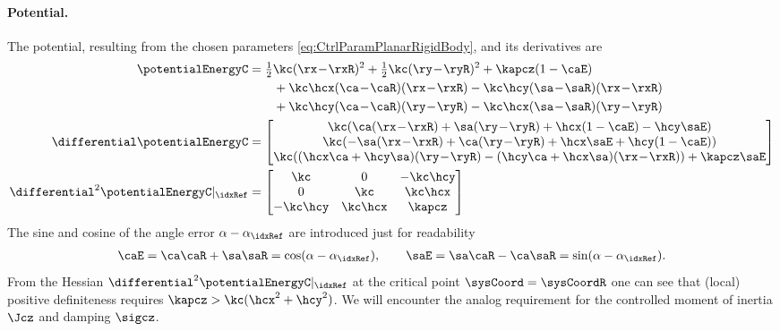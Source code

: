 \paragraph{Potential.}
The potential, resulting from the chosen parameters \eqref{eq:CtrlParamPlanarRigidBody}, and its derivatives are
\begin{subequations}
\begin{align}
 \potentialEnergyC &= \tfrac{1}{2} \kc (\rx\!-\!\rxR)^2 + \tfrac{1}{2} \kc (\ry\!-\!\ryR)^2 + \kapcz (1-\caE)
\nonumber\\
 &\qquad+ \kc\hcx(\ca\!-\!\caR)(\rx\!-\!\rxR) - \kc\hcy(\sa\!-\!\saR)(\rx\!-\!\rxR)
\nonumber\\
 &\qquad+ \kc\hcy(\ca\!-\!\caR)(\ry\!-\!\ryR) - \kc\hcx(\sa\!-\!\saR)(\ry\!-\!\ryR)
\label{eq:CtrlPotentialPlanarRigidBody}\\
 \differential \potentialEnergyC &= 
 \begin{bmatrix}
  \kc( \ca(\rx\!-\!\rxR) + \sa(\ry\!-\!\ryR) + \hcx(1-\caE) - \hcy\saE) \\
  \kc(-\sa(\rx\!-\!\rxR) + \ca(\ry\!-\!\ryR) + \hcx\saE + \hcy(1-\caE)) \\
  \kc( (\hcx\ca+\hcy\sa) (\ry\!-\!\ryR) - (\hcy\ca+\hcx\sa) (\rx\!-\!\rxR) ) + \kapcz\saE
 \end{bmatrix}
\\
 \differential^2 \potentialEnergyC |_{\idxRef} &=
 \begin{bmatrix}
  \kc & 0 & -\kc\hcy \\
  0 & \kc & \kc\hcx \\
  -\kc\hcy & \kc\hcx & \kapcz
 \end{bmatrix}
\end{align}
\end{subequations}
The sine and cosine of the angle error $\alpha-\alpha_{\idxRef}$ are introduced just for readability
\begin{align}\label{eq:ErrorCoordPlanarRigidBody}
 \caE = \ca \caR + \sa \saR = \cos(\alpha-\alpha_{\idxRef}),
\qquad
 \saE = \sa \caR - \ca \saR = \sin(\alpha-\alpha_{\idxRef}).
\end{align}
From the Hessian $\differential^2 \potentialEnergyC |_{\idxRef}$ at the critical point $\sysCoord=\sysCoordR$ one can see that (local) positive definiteness requires $\kapcz > \kc (\hcx^2+\hcy^2)$.
We will encounter the analog requirement for the controlled moment of inertia $\Jcz$ and damping $\sigcz$.

